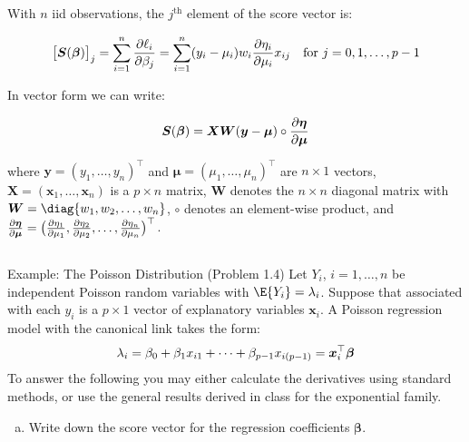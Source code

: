 \documentclass[oneside]{book}\usepackage[]{graphicx}\usepackage[svgnames]{xcolor}
\let\log\relax%
\providecommand{\Vector}[1]{\bm{#1}}%
\providecommand{\Matrix}[1]{\bm{#1}}
\begin{document}
With $ n $ iid observations, the $ j^{\text{th}} $ element of the score vector is:
\begin{Regular}{}
    \[ \bigl[ \Vector{S}(\Vector{\beta})\bigr]_j=\sum_{i=1}^{n} \pdv{\ell_i}{\beta_j}=\sum_{i=1}^{n} (y_i-\mu_i)w_i\pdv{\eta_i}{\mu_i}x_{ij}\quad\text{for $j=0,1,\ldots,p-1$} \]
\end{Regular}
In vector form we can write:
\begin{Regular}{}
    \[ \Vector{S}(\Vector{\beta})=\Matrix{X}\Matrix{W}(\Vector{y}-\Vector{\mu})\circ \pdv{\Vector{\eta}}{\Vector{\mu}} \]
\end{Regular}
where $ \Vector{y}=(y_1,\ldots,y_n)^\top $ and $ \Vector{\mu}=(\mu_1,\ldots,\mu_n)^\top $ are $ n\times 1 $ vectors, $ \Matrix{X}=(\Vector{x}_1,\ldots,\Vector{x}_n) $
is a $ p\times n $ matrix, $ \Matrix{W} $ denotes the $ n\times n $ diagonal matrix with $ \Matrix{W}=\diag{w_1,w_2,\ldots,w_n} $,
$ \circ $ denotes an element-wise product, and $ \pdv{\Vector{\eta}}{\Vector{\mu}}=\bigl(\pdv{\eta_1}{\mu_1},\pdv{\eta_2}{\mu_2},\ldots,\pdv{\eta_n}{\mu_n}\bigr)^\top $.
\subsection*{}
\begin{Example}{Example: The Poisson Distribution (Problem 1.4)}
    Let $ Y_i $, $ i=1,\ldots,n $ be independent Poisson random variables with $ \E{Y_i}=\lambda_i $. Suppose
    that associated with each $ y_i $ is a $ p\times 1 $ vector of explanatory variables $ \Vector{x}_i $. A Poisson
    regression model with the canonical link takes the form:
    \[ \log{\lambda_i}=\beta_0+\beta_1x_{i1}+\cdots+\beta_{p-1}x_{i(p-1)}=\Vector{x}_i^\top \Vector{\beta} \]
    To answer the following you may either calculate the derivatives using standard
    methods, or use the general results derived in class for the exponential family.
    \begin{enumerate}[a.]
        \item Write down the score vector for the regression coefficients $ \Vector{\beta} $.
    \end{enumerate}
\end{Example}
\end{document}
